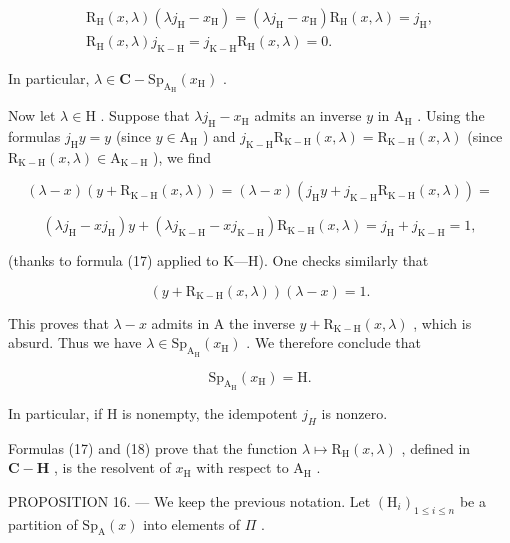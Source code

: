 \[
\begin{array}{r} \mathrm {R_ {H}} (x, \lambda) (\lambda j _ {\mathrm{H}} - x _ {\mathrm{H}}) = (\lambda j _ {\mathrm{H}} - x _ {\mathrm{H}}) \mathrm {R_ {H}} (x, \lambda) = j _ {\mathrm{H}}, \\ \mathrm {R_ {H}} (x, \lambda) j _ {\mathrm {K-H}} = j _ {\mathrm {K-H}} \mathrm {R_ {H}} (x, \lambda) = 0. \end{array}\tag{17}
\]

In particular, \(\lambda \in \mathbf{C} - \mathrm{Sp}_{\mathrm{A_H}}(x_\mathrm{H})\) .

Now let \(\lambda\in\mathrm{H}\) . Suppose that \(\lambda j_{\mathrm{H}}-x_{\mathrm{H}}\) admits an inverse \(y\) in \(\mathrm{A}_{\mathrm{H}}\) . Using the formulas \(j_{\mathrm{H}}y=y\) (since \(y\in\mathrm{A}_{\mathrm{H}}\) ) and \(j_{\mathrm{K-H}}\mathrm{R}_{\mathrm{K-H}}(x,\lambda)=\mathrm{R}_{\mathrm{K-H}}(x,\lambda)\) (since \(\mathrm{R}_{\mathrm{K-H}}(x,\lambda)\in\mathrm{A}_{\mathrm{K-H}}\) ), we find

\[
(\lambda - x) (y + \mathrm{R} _ {\mathrm{K-H}} (x, \lambda)) = (\lambda - x) (j _ {\mathrm{H}} y + j _ {\mathrm{K-H}} \mathrm{R} _ {\mathrm{K-H}} (x, \lambda)) =
\]

\[
(\lambda j _ {\mathrm{H}} - x j _ {\mathrm{H}}) y + (\lambda j _ {\mathrm {K-H}} - x j _ {\mathrm {K-H}}) \mathrm{R} _ {\mathrm {K-H}} (x, \lambda) = j _ {\mathrm{H}} + j _ {\mathrm {K-H}} = 1,
\]

(thanks to formula (17) applied to K---H). One checks similarly that

\[
(y + \mathrm{R} _ {\mathrm{K-H}} (x, \lambda)) (\lambda - x) = 1.
\]

This proves that \(\lambda - x\) admits in A the inverse \(y + \mathrm{R}_{\mathrm{K - H}}(x, \lambda)\) , which is absurd. Thus we have \(\lambda \in \mathrm{Sp}_{\mathrm{A_H}}(x_{\mathrm{H}})\) . We therefore conclude that

\[
\mathrm{Sp} _ {\mathrm{A} _ {\mathrm{H}}} (x _ {\mathrm{H}}) = \mathrm{H}.\tag{18}
\]

In particular, if H is nonempty, the idempotent \(j_{H}\) is nonzero.

Formulas (17) and (18) prove that the function \(\lambda \mapsto \mathrm{R}_{\mathrm{H}}(x,\lambda)\) , defined in \(\mathbf{C} - \mathbf{H}\) , is the resolvent of \(x_{\mathrm{H}}\) with respect to \(\mathrm{A_H}\) .

PROPOSITION 16. --- We keep the previous notation. Let \((\mathrm{H}_{i})_{1\leqslant i\leqslant n}\) be a partition of \(\mathrm{Sp}_{\mathrm{A}}(x)\) into elements of \(\Pi\) .

